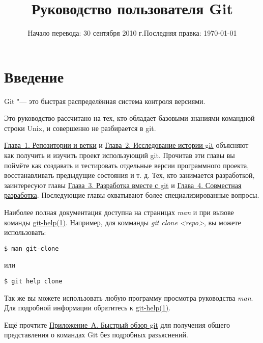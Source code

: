 \documentclass[a4paper, 12pt, oneside]{scrreprt}
\title{Руководство пользователя Git}
\date{Начало перевода: 30 сентября 2010 г.\linebreak Последняя правка: \today}
\begin{document}
\lstset{language=bash, 
		frame=trbl,
		frameround=tttt,
		basicstyle=\tt , 
		keywordstyle=\textbf,		
		commentstyle=\textit
		}

\maketitle
\tableofcontents


%
%
\newpage
\section*{Введение}
\hypertarget{#preface}{}

Git "--- это быстрая распределённая система контроля версиями.

Это руководство рассчитано на тех, кто обладает базовыми знаниями командной
строки Unix, и совершенно не разбирается в git.

\href{#chapter1}{Глава~1. Репозитории и ветки} и 
\href{#chapter2}{Глава~2. Исследование истории git} объясняют как 
получить и изучить проект использующий git. Прочитав эти главы вы поймёте как 
создавать и тестировать отдельные версии программного проекта, восстанавливать 
предыдущие состояния и т. д. Тех, кто занимается разработкой, заинтересуют главы
\href{#chapter3}{Глава~3. Разработка вместе с git} и 
\href{#chapter4}{Глава~4. Совместная разработка}. Последующие главы 
охватывают более специализированные вопросы.

Наиболее полная документация доступна на страницах \emph{man} и при вызове
команды \href{http://www.kernel.org/pub/software/scm/git/docs/git-help.html}
{git-help(1)}. Например, для комманды \emph{git clone <repo>}, вы 
можете использовать:

\begin{lstlisting}
$ man git-clone
\end{lstlisting}

или

\begin{lstlisting}
$ git help clone
\end{lstlisting}

Так же вы можете использовать любую программу просмотра руководства
\emph{man}.
Для подробной информации обратитесь к 
\href{http://www.kernel.org/pub/software/scm/git/docs/git-help.html}
{git-help(1)}.

Ещё прочтите \href{#appendixa}{Приложение~А. Быстрый обзор git} для получения
общего представления о командах Git без подробных разъяснений.
\end{document}
